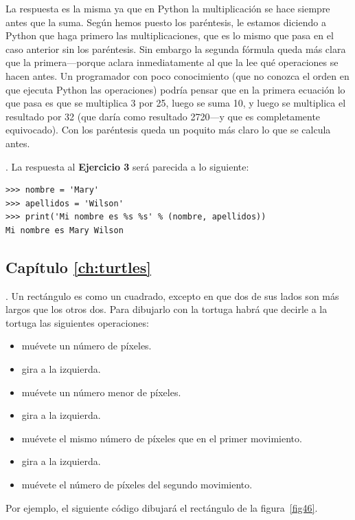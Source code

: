\noindent
La respuesta es la misma ya que en Python la multiplicación se hace siempre antes que la suma. Según hemos puesto los paréntesis, le estamos diciendo a Python que haga primero las multiplicaciones, que es lo mismo que pasa en el caso anterior sin los paréntesis.  Sin embargo la segunda fórmula queda más clara que la primera---porque aclara inmediatamente al que la lee qué operaciones se hacen antes.   Un programador con poco conocimiento (que no conozca el orden en que ejecuta Python las operaciones) podría pensar que en la primera ecuación lo que pasa es que se multiplica 3 por 25, luego se suma 10, y luego se multiplica el resultado por 32 (que daría como resultado 2720---y que es completamente equivocado).   Con los paréntesis queda un poquito más claro lo que se calcula antes.

.  La respuesta al \textbf{Ejercicio 3} será parecida a lo siguiente:

\begin{listing}
\begin{verbatim}
>>> nombre = 'Mary'
>>> apellidos = 'Wilson'
>>> print('Mi nombre es %s %s' % (nombre, apellidos))
Mi nombre es Mary Wilson
\end{verbatim}
\end{listing}

\subsection*{Capítulo \ref{ch:turtles}}

. Un rectángulo es como un cuadrado, excepto en que dos de sus lados son más largos que los otros dos.   Para dibujarlo con la tortuga habrá que decirle a la tortuga las siguientes operaciones:

\begin{itemize}
 \item muévete un número de píxeles.
 \item gira a la izquierda.
 \item muévete un número menor de píxeles.
 \item gira a la izquierda.
 \item muévete el mismo número de píxeles que en el primer movimiento.
 \item gira a la izquierda.
 \item muévete el número de píxeles del segundo movimiento.
\end{itemize}

\noindent
Por ejemplo, el siguiente código dibujará el rectángulo de la figura~\ref{fig46}.

